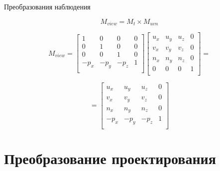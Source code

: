 \documentclass{beamer}
\begin{document}
	\begin{frame}{Преобразования наблюдения}

		\[
			M_{view} = M_{t} \times M_{uvn}
	 \]

	 \[
		 M_{view} = 
		 \begin{bmatrix}
			 1 & 0 & 0 & 0 \\
			 0 & 1 & 0 & 0 \\
			 0 & 0 & 1 & 0 \\
			 -p_x & -p_y & -p_z & 1 \\
		 \end{bmatrix}	
		 \begin{bmatrix}
			 u_x & u_y & u_z & 0 \\
			 v_x & v_y & v_z & 0 \\
			 n_x & n_y & n_z & 0 \\
			 0 & 0 & 0 & 1 \\
		 \end{bmatrix}	
		 =
	 \]

	 \[
		 =
		 \begin{bmatrix}
			 u_x & u_y & u_z & 0 \\
			 v_x & v_y & v_z & 0 \\
			 n_x & n_y & n_z & 0 \\
			 -p_x & -p_y & -p_z & 1 \\
		 \end{bmatrix}	
	 \]

	\end{frame}


	\section{Преобразование проектирования}
\end{document}
